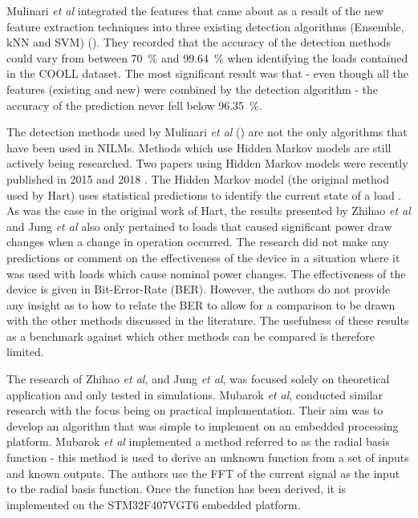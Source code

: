 Mulinari \emph{et al} integrated the features that came about as a result of the new feature extraction techniques into three existing detection algorithms (Ensemble, kNN and SVM) (\cite{8895360}). They recorded that the accuracy of the detection methods could vary from between \qty{70}{\%} and \qty{99.64}{\%} when identifying the loads contained in the COOLL dataset. The most significant result was that - even though all the features (existing and new) were combined by the detection algorithm - the accuracy of the prediction never fell below \qty{96.35}{\%}.     
\par
The detection methods used by Mulinari \emph{et al} (\cite{8895360}) are not the only algorithms that have been used in NILMs.
 Methods which use Hidden Markov models are still actively being researched. Two papers using Hidden Markov models were recently published in 2015 and 2018 \cite{RN38,RN40}. The Hidden Markov model (the original method used by Hart) uses statistical predictions to identify the current state of a load \cite{RN42}. As was the case in the original work of Hart, the results presented by Zhihao \emph{et al} \cite{RN38} and Jung \emph{et al} \cite{RN40} also only pertained to loads that caused significant power draw changes when a change in operation occurred. The research did not make any predictions or comment on the effectiveness of the device in a situation where it was used with loads which cause nominal power changes. 
 The effectiveness of the device is given in Bit-Error-Rate (BER). However, the authors do not provide any insight as to how to relate the BER to allow for a comparison to be drawn with the other methods discussed in the literature. The usefulness of these results as a benchmark against which other methods can be compared is therefore limited.
 \par
 The research of Zhihao \emph{et al}, \cite{RN38} and Jung \emph{et al}, \cite{RN40} was focused solely on theoretical application and only tested in simulations. Mubarok \emph{et al}, \cite{RN47} conducted similar research with the focus being on practical implementation. Their aim was to develop an algorithm that was simple to implement on an embedded processing platform. 
 Mubarok \emph{et al} implemented a method referred to as the radial basis function - this method is used to derive an unknown function from a set of inputs and known outputs. The authors use the FFT of the current signal as the input to the radial basis function. Once the function has been derived, it is implemented on the STM32F407VGT6 embedded platform. 
